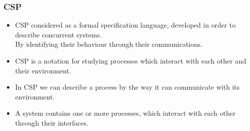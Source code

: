 \documentclass{beamer}
\begin{document}







\begin{frame}
\frametitle {CSP}
\begin{itemize}

\item CSP considered as a formal specification language, developed in order to describe concurrent systems. \\
{\footnotesize By identifying their behaviour through their communications.}

\item CSP is a notation for studying processes which interact with each other and their environment.

\item In CSP we can describe a process by the way it can communicate with its environment. 


\item A system contains one or more processes, which interact with each other through their interfaces. 

\end{itemize}
\end{frame}






\end{document}
